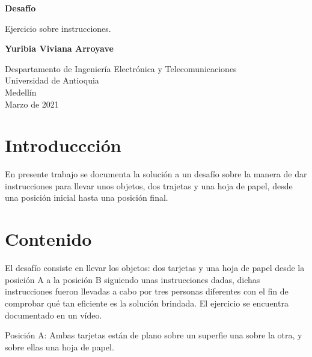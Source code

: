 \documentclass{article}
\begin{document}
\begin{titlepage}
    \begin{center}
        \vspace*{1cm}
            
        \Huge
        \textbf{Desafío}
            
        \vspace{0.5cm}
        \LARGE
        Ejercicio sobre instrucciones.
            
        \vspace{1.5cm}
            
        \textbf{Yuribia Viviana Arroyave}
            
        \vfill
            
        \vspace{0.8cm}
            
        \Large
        Despartamento de Ingeniería Electrónica y Telecomunicaciones\\
        Universidad de Antioquia\\
        Medellín\\
        Marzo de 2021
            
    \end{center}
\end{titlepage}

\tableofcontents
\newpage
\section{Introduccción}\label{intro}
En presente trabajo se documenta la solución a un desafío sobre la manera de dar instrucciones para llevar unos  objetos, dos trajetas y una hoja de papel, desde una posición inicial hasta una posición final.

\section{Contenido} \label{contenido}
El desafío consiste en llevar los objetos: dos tarjetas y una hoja de papel desde la posición A a la posición B siguiendo unas instrucciones dadas, dichas instrucciones fueron llevadas a cabo por tres personas diferentes con el fin de comprobar qué tan eficiente es la solución brindada. El ejercicio se encuentra documentado en un vídeo.
\vspace{0.8cm}

Posición A: Ambas tarjetas están de plano sobre un superfie una sobre la otra, y sobre ellas una hoja de papel.
\end{document}
